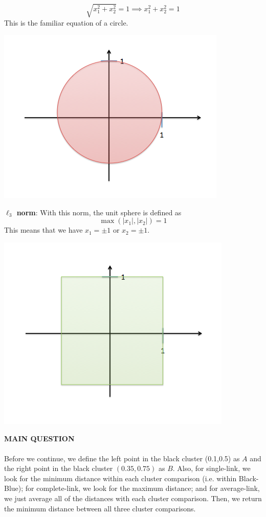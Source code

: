 \documentclass[submit]{harvardml}
\begin{document}
	$$\sqrt{x_1^2 + x_2^2} = 1 \implies x_1^2 + x_2^2 = 1$$
This is the familiar equation of a circle. \\ 
	\centerline{\includegraphics[scale=0.5]{./l2}}		
\textbf{$\ell_3$ norm}: With this norm, the unit sphere is defined as 
	$$\max (|x	_1|, |x_2|) =1$$
This means that we have $x_1 = \pm 1$ or $x_2 = \pm 1$. \\
	\centerline{\includegraphics[scale=0.5]{./li}}
\textbf{MAIN QUESTION} \\ \\
Before we continue, we define the left point in the black cluster (0.1,0.5) as $A$  and the right point in the black cluster $(0.35,0.75)$ as $B$. Also, for single-link, we look for the minimum distance within each cluster comparison (i.e. within Black-Blue); for complete-link, we look for the maximum distance; and for average-link, we just average all of the distances with each cluster comparison. Then, we return the minimum distance between all three cluster comparisons. \\\\ 
\end{document}
